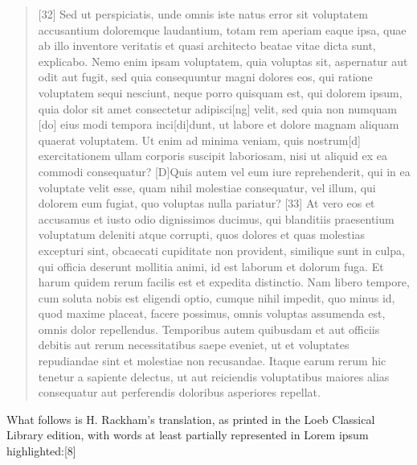 \begin{quotation}
[32] Sed ut perspiciatis, unde omnis iste natus error sit voluptatem
accusantium doloremque laudantium, totam rem aperiam eaque ipsa, quae ab illo
inventore veritatis et quasi architecto beatae vitae dicta sunt, explicabo.
Nemo enim ipsam voluptatem, quia voluptas sit, aspernatur aut odit aut fugit,
sed quia consequuntur magni dolores eos, qui ratione voluptatem sequi nesciunt,
neque porro quisquam est, qui dolorem ipsum, quia dolor sit amet consectetur
adipisci[ng] velit, sed quia non numquam [do] eius modi tempora inci[di]dunt,
ut labore et dolore magnam aliquam quaerat voluptatem. Ut enim ad minima
veniam, quis nostrum[d] exercitationem ullam corporis suscipit laboriosam, nisi
ut aliquid ex ea commodi consequatur? [D]Quis autem vel eum iure reprehenderit,
qui in ea voluptate velit esse, quam nihil molestiae consequatur, vel illum,
qui dolorem eum fugiat, quo voluptas nulla pariatur? [33] At vero eos et
accusamus et iusto odio dignissimos ducimus, qui blanditiis praesentium
voluptatum deleniti atque corrupti, quos dolores et quas molestias excepturi
sint, obcaecati cupiditate non provident, similique sunt in culpa, qui officia
deserunt mollitia animi, id est laborum et dolorum fuga. Et harum quidem rerum
facilis est et expedita distinctio. Nam libero tempore, cum soluta nobis est
eligendi optio, cumque nihil impedit, quo minus id, quod maxime placeat, facere
possimus, omnis voluptas assumenda est, omnis dolor repellendus. Temporibus
autem quibusdam et aut officiis debitis aut rerum necessitatibus saepe eveniet,
ut et voluptates repudiandae sint et molestiae non recusandae. Itaque earum
rerum hic tenetur a sapiente delectus, ut aut reiciendis voluptatibus maiores
alias consequatur aut perferendis doloribus asperiores repellat.
\end{quotation}

What follows is H. Rackham's translation, as printed in the Loeb Classical
Library edition, with words at least partially represented in Lorem ipsum
highlighted:[8]


